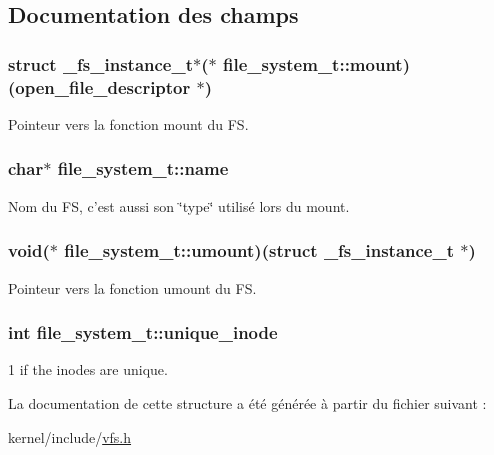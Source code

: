 \subsection{Documentation des champs}
\hypertarget{structfile__system__t_a7edaed95e6ac68991bbaac6cd07b458b}{
\subsubsection[{mount}]{\setlength{\rightskip}{0pt plus 5cm}struct {\bf \-\_\-fs\-\_\-instance\-\_\-t}$\ast$($\ast$ file\-\_\-system\-\_\-t\-::mount)({\bf open\-\_\-file\-\_\-descriptor} $\ast$)\hspace{0.3cm}{\ttfamily [read]}}}\label{structfile__system__t_a7edaed95e6ac68991bbaac6cd07b458b}
Pointeur vers la fonction mount du F\-S. \hypertarget{structfile__system__t_a2b7d7c0f769113d1164052beeeca777d}{
\subsubsection[{name}]{\setlength{\rightskip}{0pt plus 5cm}char$\ast$ file\-\_\-system\-\_\-t\-::name}}\label{structfile__system__t_a2b7d7c0f769113d1164052beeeca777d}
Nom du F\-S, c'est aussi son \char`\"{}type\char`\"{} utilisé lors du mount. \hypertarget{structfile__system__t_a899f34d838d88470373b60f7c5f0edd9}{
\subsubsection[{umount}]{\setlength{\rightskip}{0pt plus 5cm}void($\ast$ file\-\_\-system\-\_\-t\-::umount)(struct {\bf \-\_\-fs\-\_\-instance\-\_\-t} $\ast$)}}\label{structfile__system__t_a899f34d838d88470373b60f7c5f0edd9}
Pointeur vers la fonction umount du F\-S. \hypertarget{structfile__system__t_a3cf80f0c2c2b7a9c202d5006e4095eaf}{
\subsubsection[{unique\-\_\-inode}]{\setlength{\rightskip}{0pt plus 5cm}int file\-\_\-system\-\_\-t\-::unique\-\_\-inode}}\label{structfile__system__t_a3cf80f0c2c2b7a9c202d5006e4095eaf}
1 if the inodes are unique. 

La documentation de cette structure a été générée à partir du fichier suivant \-:\begin{DoxyCompactItemize}
\item 
kernel/include/\hyperlink{vfs_8h}{vfs.\-h}\end{DoxyCompactItemize}

